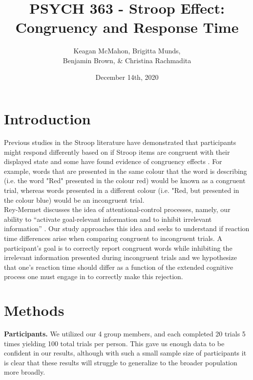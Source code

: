\documentclass{article}
\author{Keagan McMahon, Brigitta Munds, \\ Benjamin Brown, \& Christina Rachmadita}
\date{December 14th, 2020}
\title{PSYCH 363 - Stroop Effect: Congruency and Response Time}
\begin{document}
\maketitle
\tableofcontents



\section{Introduction}
\label{sec:org4c11422}

\hspace{1em} Previous studies in the Stroop literature have demonstrated that participants might respond differently based on if Stroop items are congruent with their displayed state and some have found evidence of congruency effects \cite{SpinelliGiacomo2020WMLD}. For example, words that are presented in the same colour that the word is describing (i.e. the word "Red" presented in the colour red) would be known as a congruent trial, whereas words presented in a different colour (i.e. "Red, but presented in the colour blue) would be an incongruent trial.\\

Rey-Mermet discusses the idea of attentional-control processes, namely, our ability to ``activate goal-relevant information and to inhibit irrelevant information'' \cite{Mermet2020Faib}. Our study approaches this idea and seeks to understand if reaction time differences arise when comparing congruent to incongruent trials. A participant's goal is to correctly report congruent words while inhibiting the irrelevant information presented during incongruent trials and we hypothesize that one's reaction time should differ as a function of the extended cognitive process one must engage in to correctly make this rejection.

\section{Methods}
\label{sec:org87f4958}

\hspace{1em} \textbf{Participants.} We utilized our 4 group members, and each completed 20 trials 5 times yielding 100 total trials per person. This gave us enough data to be confident in our results, although with such a small sample size of participants it is clear that these results will struggle to generalize to the broader population more broadly. \\
\end{document}
